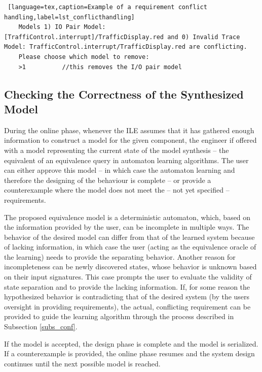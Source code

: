 \bigskip
\begin{minipage}{\linewidth}
\begin{lstlisting} [language=tex,caption=Example of a requirement conflict handling,label=lst_conflicthandling]
	Models 1) IO Pair Model: [TraffiControl.interrupt]/TrafficDisplay.red and 0) Invalid Trace Model: TrafficControl.interrupt/TrafficDisplay.red are conflicting.
	Please choose which model to remove: 
	>1			//this removes the I/O pair model
\end{lstlisting}
\end{minipage}

\subsection{Checking the Correctness of the Synthesized Model} \label{subs_eq}
During the online phase, whenever the ILE assumes that it has gathered enough information to construct a model for the given component, the engineer if offered with a model representing the current state of the model synthesis -- the equivalent of an equivalence query in automaton learning algorithms. The user can either approve this model -- in which case the automaton learning and therefore the designing of the behaviour is complete -- or provide a counterexample where the model does not meet the -- not yet specified -- requirements.

The proposed equivalence model is a deterministic automaton, which, based on the information provided by the user, can be incomplete in multiple ways. The behavior of the desired model can differ from that of the learned system because of lacking information, in which case the user (acting as the equivalence oracle of the learning) needs to provide the separating behavior. Another reason for incompleteness can be newly discovered states, whose behavior is unknown based on their input signatures. This case prompts the user to evaluate the validity of state separation and to provide the lacking information. If, for some reason the hypothesized behavior is contradicting that of the desired system (by the users oversight in providing requirements), the actual, conflicting requirement can be provided to guide the learning algorithm through the process described in Subsection \ref{subs_conf}.

If the model is accepted, the design phase is complete and the model is serialized. If a counterexample is provided, the online phase resumes and the system design continues until the next possible model is reached.

